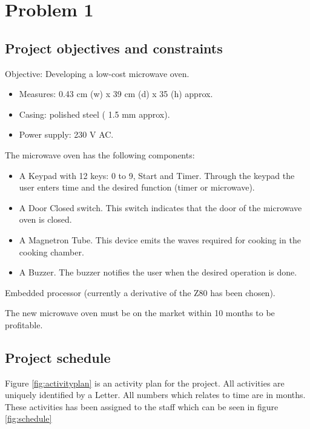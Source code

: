 \chapter{Problem 1}
\label{chp:intro}

\section{Project objectives and constraints}

Objective: Developing a low-cost microwave oven. 

\begin{itemize}
	\setlength\itemsep{0.1em}
	\item Measures: 0.43 cm (w) x 39 cm (d) x 35 (h) approx.
	\item Casing: polished steel ( 1.5 mm approx).
	\item Power supply: 230 V AC.
\end{itemize}

The microwave oven has the following components:

\begin{itemize}
	\setlength\itemsep{0.1em}
	\item A Keypad with 12 keys: 0 to 9, Start and Timer. Through the keypad the user enters
	time and the desired function (timer or microwave).

	\item A Door Closed switch. This switch indicates that the door of the microwave oven is
	closed.

	\item A Magnetron Tube. This device emits the waves required for cooking in the cooking
	chamber.
	
	\item A Buzzer. The buzzer notifies the user when the desired operation is done.
\end{itemize}

Embedded processor (currently a derivative of the Z80 has been chosen).

The new microwave oven must be on the market within 10 months to be profitable.

\section{Project schedule}
Figure \ref{fig:activityplan} is an activity plan for the project. All activities are uniquely identified by a Letter. All numbers which relates to time are in months. These activities has been assigned to the staff which can be seen in figure \ref{fig:schedule} 
